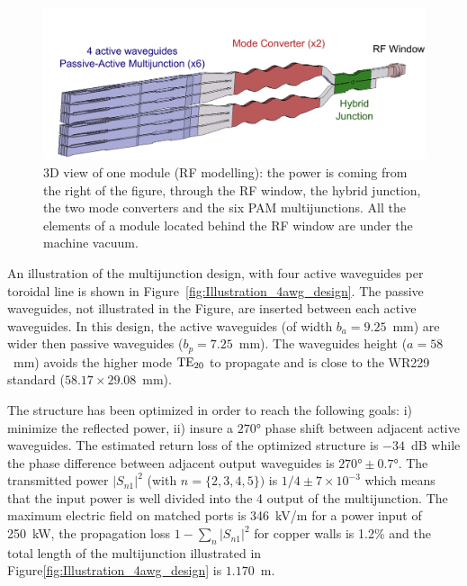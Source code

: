 {\begin{figure}
	\includegraphics[width=1.0\textwidth]{figures/chap3/ITER_antenna/LH4ITER_1module}
	\caption{3D view of one module (RF modelling): the power is coming from the
		right of the figure, through the RF window, the hybrid junction, the
		two mode converters and the six PAM multijunctions. All the elements
		of a module located behind the RF window are under the machine vacuum.}
	\label{fig:3D-view_1module}
\end{figure}

An illustration of the multijunction design, with four active waveguides per toroidal line is shown in Figure~\ref{fig:Illustration_4awg_design}. The passive waveguides, not illustrated in the Figure, are inserted between each active waveguides. In this design, the active waveguides (of width $b_{a}=9.25$~mm) are wider then passive waveguides ($b_{p}=7.25$~mm). The waveguides height ($a=58$~mm) avoids the higher mode ${\mathrm{TE}}_{20}$ to propagate and is close to the WR229 standard ($58.17\times29.08$~mm). 

The structure has been optimized in order to reach the following goals: i) minimize the reflected power, ii) insure a $270\si{\degree}$ phase shift between adjacent active waveguides. The estimated return loss of the optimized structure is $-34$~dB while the phase difference between adjacent output waveguides is $270\si{\degree} \pm 0.7\si{\degree}$. The transmitted power $\left|S_{n1}\right|^{2}$ (with $n=\{2,3,4,5\})$ is $1/4\pm7\times10^{-3}$ which means that the input power is well divided into the 4 output of the multijunction. The maximum electric field on matched ports is 346~kV/m for a power input of 250~kW, the propagation loss $1-\sum_{n} \left| S_{n1} \right|^{2}$ for copper walls is 1.2\% and the total length of the multijunction illustrated in Figure\ref{fig:Illustration_4awg_design} is $1.170$~m. 

}
